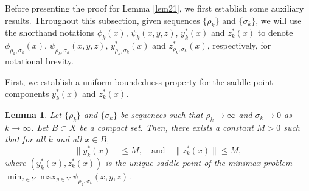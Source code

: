 \documentclass{article}
\newtheorem{lemma}[theorem]{Lemma}
\begin{document}
Before presenting the proof for Lemma \ref{lem21}, we first establish some auxiliary results. Throughout this subsection, given sequences $\{\rho_k\}$ and $\{\sigma_k\}$, we will use the shorthand notations $\phi_k(x)$, $\psi_k(x,y,z)$, $y^*_k(x)$ and $z^*_k(x)$ to denote $\phi_{\rho_k,\sigma_k}(x)$, $\psi_{\rho_k,\sigma_k}(x,y,z)$, $y^*_{\rho_k,\sigma_k}(x)$ and $z^*_{\rho_k,\sigma_k}(x)$, respectively, for notational brevity.

First, we establish a uniform boundedness property for the saddle point components $y^*_{k}(x)$ and $z^*_{k}(x)$.

\begin{lemma}\label{saddlepointboundedness}
 Let $\{\rho_k\}$ and $\{\sigma_k\}$ be sequences such that $\rho_k \rightarrow \infty$ and $\sigma_k \rightarrow 0$ as $k \rightarrow \infty$. Let $B \subset X$ be a compact set. Then, there exists a constant $M > 0$ such that for all $k$ and all $x \in B$,
 \[
 \|y^*_{k}(x)\| \le M, \quad \text{and} \quad \|z^*_{k}(x)\| \le M,
 \]
 where $(y_{k}^*(x),z_{k}^*(x))$ is the unique saddle point of the minimax problem $\min_{z\in {Y}} \max_{ y \in {Y}}\psi_{\rho_k,\sigma_k}(x, y, z)$.
\end{lemma}
\end{document}
